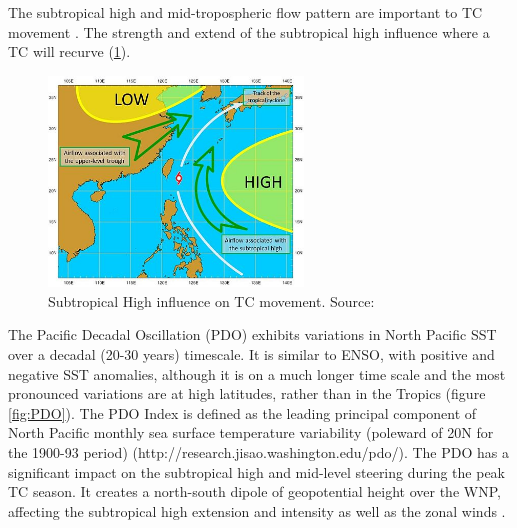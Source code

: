 

The subtropical high and mid-tropospheric flow pattern are important to TC movement \citep{chan1982tropical}. The strength and extend of the subtropical high influence where a TC will recurve (\ref{fig:STH}). %

\begin{figure}[h]
	\centering
	\noindent\includegraphics[width=16pc,angle=0]{typhoon16_1e.jpg}
	\caption{Subtropical High influence on TC movement. Source: }\label{fig:STH}
\end{figure}

The Pacific Decadal Oscillation (PDO) exhibits variations in North Pacific SST over a decadal (20-30 years) timescale. It is similar to ENSO, with positive and negative SST anomalies, although it is on a much longer time scale and the most pronounced variations are at high latitudes, rather than in the Tropics  (figure \ref{fig:PDO}). The PDO Index is defined as the leading principal component of North Pacific monthly sea surface temperature variability (poleward of 20N for the 1900-93 period) (http://research.jisao.washington.edu/pdo/). The PDO has a significant impact on the subtropical high and mid-level steering during the peak TC season. It creates a north-south dipole of geopotential height over the WNP, affecting the subtropical high extension and intensity as well as the zonal winds \citep{liu2008interdecadal}.


